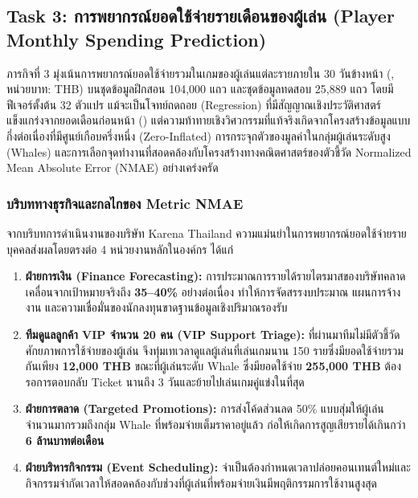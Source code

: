 \clearpage
\subsection{Task 3: การพยากรณ์ยอดใช้จ่ายรายเดือนของผู้เล่น (Player Monthly Spending Prediction)}
\label{subsec:task3}

ภารกิจที่ 3 มุ่งเน้นการพยากรณ์ยอดใช้จ่ายรวมในเกมของผู้เล่นแต่ละรายภายใน 30 วันข้างหน้า (, หน่วยบาท: THB) บนชุดข้อมูลฝึกสอน 104,000 แถว และชุดข้อมูลทดสอบ 25,889 แถว โดยมีฟีเจอร์ตั้งต้น 32 ตัวแปร แม้จะเป็นโจทย์ถดถอย (Regression) ที่มีสัญญาณเชิงประวัติศาสตร์แข็งแกร่งจากยอดเดือนก่อนหน้า () แต่ความท้าทายเชิงวิศวกรรมที่แท้จริงเกิดจากโครงสร้างข้อมูลแบบกึ่งต่อเนื่องที่มีศูนย์เกือบครึ่งหนึ่ง (Zero-Inflated) การกระจุกตัวของมูลค่าในกลุ่มผู้เล่นระดับสูง (Whales) และการเลือกจุดทำงานที่สอดคล้องกับโครงสร้างทางคณิตศาสตร์ของตัวชี้วัด Normalized Mean Absolute Error (NMAE) อย่างเคร่งครัด

\subsubsection{บริบททางธุรกิจและกลไกของ Metric NMAE}
\label{subsubsec:t3_business_metric}

จากบริบทการดำเนินงานของบริษัท Karena Thailand ความแม่นยำในการพยากรณ์ยอดใช้จ่ายรายบุคคลส่งผลโดยตรงต่อ 4 หน่วยงานหลักในองค์กร ได้แก่
\begin{enumerate}
    \item \textbf{ฝ่ายการเงิน (Finance Forecasting):} การประมาณการรายได้รายไตรมาสของบริษัทคลาดเคลื่อนจากเป้าหมายจริงถึง \textbf{35--40\%} อย่างต่อเนื่อง ทำให้การจัดสรรงบประมาณ แผนการจ้างงาน และความเชื่อมั่นของนักลงทุนขาดฐานข้อมูลเชิงปริมาณรองรับ
    \item \textbf{ทีมดูแลลูกค้า VIP จำนวน 20 คน (VIP Support Triage):} ที่ผ่านมาทีมไม่มีตัวชี้วัดศักยภาพการใช้จ่ายของผู้เล่น จึงทุ่มเทเวลาดูแลผู้เล่นที่เล่นเกมนาน 150 รายซึ่งมียอดใช้จ่ายรวมกันเพียง \textbf{12,000 THB} ขณะที่ผู้เล่นระดับ Whale ซึ่งมียอดใช้จ่าย \textbf{255,000 THB} ต้องรอการตอบกลับ Ticket นานถึง 3 วันและย้ายไปเล่นเกมคู่แข่งในที่สุด
    \item \textbf{ฝ่ายการตลาด (Targeted Promotions):} การส่งโค้ดส่วนลด 50\% แบบสุ่มให้ผู้เล่นจำนวนมากรวมถึงกลุ่ม Whale ที่พร้อมจ่ายเต็มราคาอยู่แล้ว ก่อให้เกิดการสูญเสียรายได้เกินกว่า \textbf{6 ล้านบาทต่อเดือน}
    \item \textbf{ฝ่ายบริหารกิจกรรม (Event Scheduling):} จำเป็นต้องกำหนดเวลาปล่อยคอนเทนต์ใหม่และกิจกรรมจำกัดเวลาให้สอดคล้องกับช่วงที่ผู้เล่นที่พร้อมจ่ายเงินมีพฤติกรรมการใช้งานสูงสุด
\end{enumerate}

